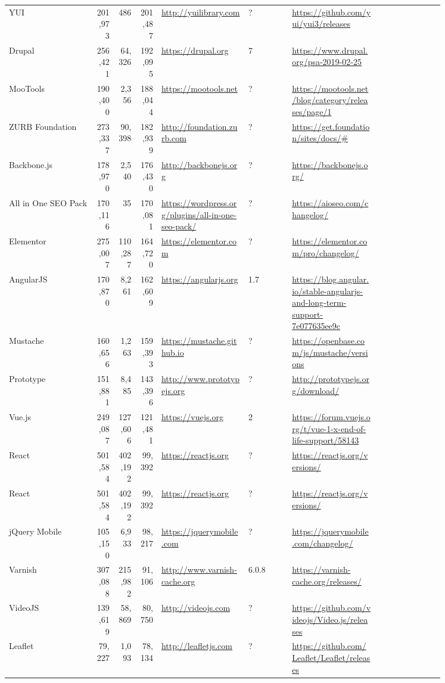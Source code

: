 \begin{longtable}{|p{0.2\linewidth}|r|r|r|p{0.2\linewidth}|p{0.1\linewidth}|p{0.2\linewidth}|p{0.15\linewidth}|}
	YUI &201,973 &486 &201,487 &\url{http://yuilibrary.com} &? &\url{https://github.com/yui/yui3/releases} \\
	Drupal &256,421 &64,326 &192,095 &\url{https://drupal.org} &7 &\url{https://www.drupal.org/psa-2019-02-25} \\
	MooTools &190,400 &2,356 &188,044 &\url{https://mootools.net} &? &\url{https://mootools.net/blog/category/releases/page/1} \\
	ZURB Foundation &273,337 &90,398 &182,939 &\url{http://foundation.zurb.com} &? &\url{https://get.foundation/sites/docs/\#} \\
	Backbone.js &178,970 &2,540 &176,430 &\url{http://backbonejs.org} &? &\url{https://backbonejs.org/} \\
	All in One SEO Pack &170,116 &35 &170,081 &\url{https://wordpress.org/plugins/all-in-one-seo-pack/} &? &\url{https://aioseo.com/changelog/} \\
	Elementor &275,007 &110,287 &164,720 &\url{https://elementor.com} &? &\url{https://elementor.com/pro/changelog/} \\
	AngularJS &170,870 &8,261 &162,609 &\url{https://angularjs.org} &1.7 &\url{https://blog.angular.io/stable-angularjs-and-long-term-support-7e077635ee9c} \\
	Mustache &160,656 &1,263 &159,393 &\url{https://mustache.github.io} &? &\url{https://openbase.com/js/mustache/versions} \\
	Prototype &151,881 &8,485 &143,396 &\url{http://www.prototypejs.org} &? &\url{http://prototypejs.org/download/} \\
	Vue.js &249,087 &127,606 &121,481 &\url{https://vuejs.org} &2 &\url{https://forum.vuejs.org/t/vue-1-x-end-of-life-support/58143} \\
	React &501,584 &402,192 &99,392 &\url{https://reactjs.org} &? &\url{https://reactjs.org/versions/} \\
	React &501,584 &402,192 &99,392 &\url{https://reactjs.org} &? &\url{https://reactjs.org/versions/} \\
	jQuery Mobile &105,150 &6,933 &98,217 &\url{https://jquerymobile.com} &? &\url{https://jquerymobile.com/changelog/} \\
	Varnish &307,088 &215,982 &91,106 &\url{http://www.varnish-cache.org} &6.0.8 &\url{https://varnish-cache.org/releases/} \\
	VideoJS &139,619 &58,869 &80,750 &\url{http://videojs.com} &? &\url{https://github.com/videojs/Video.js/releases} \\
	Leaflet &79,227 &1,093 &78,134 &\url{http://leafletjs.com} &? &\url{https://github.com/Leaflet/Leaflet/releases} \\

\end{longtable}
